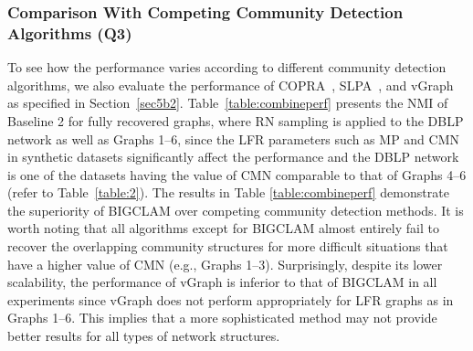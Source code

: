 \documentclass[format=acmsmall, review=false, screen=true]{acmart}
\begin{document}
\begin{table}[t]
\centering
\caption{NMI of Baseline 2 according to different community detection algorithms. Here, N/A indicates that the corresponding algorithm is unable to handle the computation due to memory consumption.}
\label{table:combineperf}
\bgroup
\def\arraystretch{1.2}%
\egroup
\end{table}

\subsubsection{Comparison With Competing Community Detection Algorithms (Q3)}\label{Q2}
To see how the performance varies according to different community detection algorithms, we also evaluate the performance of COPRA~\cite{COPRA}, SLPA~\cite{SLPA}, and vGraph~\cite{vgraph} as specified in Section~\ref{sec5b2}. Table~\ref{table:combineperf} presents the NMI of Baseline 2 for fully recovered graphs, where RN sampling is applied to the DBLP network as well as Graphs 1–6, since the LFR parameters such as MP and CMN in synthetic datasets significantly affect the performance and the DBLP network is one of the datasets having the value of CMN comparable to that of Graphs 4--6 (refer to Table~\ref{table:2}). The results in Table \ref{table:combineperf} demonstrate the superiority of BIGCLAM over competing community detection methods. It is worth noting that all algorithms except for BIGCLAM almost entirely fail to recover the overlapping community structures for more difficult situations that have a higher value of CMN (e.g., Graphs 1--3). Surprisingly, despite its lower scalability,  the performance of vGraph is inferior to that of BIGCLAM in all experiments since vGraph does not perform appropriately for LFR graphs as in Graphs 1--6. This implies
 that a more sophisticated method may not provide better results for all types of network structures.
\end{document}
